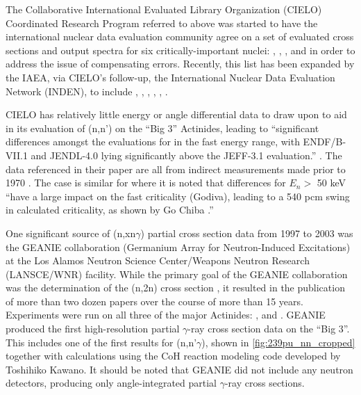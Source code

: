 \documentclass[letterpaper]{ar-1col}
\begin{document}
The Collaborative International Evaluated Library Organization (CIELO) Coordinated Research Program referred to above \cite{Cha18a} was started to have the international nuclear data evaluation community agree on a set of evaluated cross sections and output spectra for six critically-important nuclei: , , ,  and  in order to address the issue of compensating errors.
 Recently, this list has been expanded by the IAEA, via CIELO's follow-up, the International Nuclear Data Evaluation Network (INDEN), to include , , , , , .

CIELO has relatively little energy or angle differential data to draw upon to aid in its evaluation of (n,n') on the \enquote{Big 3} Actinides, leading to \enquote{significant differences amongst the evaluations for  in the fast energy range, with ENDF/B-VII.1 and JENDL-4.0 lying significantly above the JEFF-3.1 evaluation.} \cite{Cha14}.
 The  data referenced in their paper are all from indirect measurements made prior to 1970 \cite{Batchelor1969, Andreev1961}.
 The case is similar for  where it is noted that differences for $E_n >$ 50 keV \enquote{have a large impact on the fast criticality (Godiva), leading to a 540 pcm swing in calculated criticality, as shown by Go Chiba \cite{Chi12}.}

One significant source of (n,xn$\gamma$) partial cross section data from 1997 to 2003 was the GEANIE collaboration (Germanium Array for Neutron-Induced Excitations) at the Los Alamos Neutron Science Center/Weapons Neutron Research (LANSCE/WNR) facility.
While the primary goal of the GEANIE collaboration was the determination of the (n,2n) cross section \cite{Ber02}, it resulted in the publication of more than two dozen papers over the course of more than 15 years.
 Experiments were run on all three of the major Actinides:  \cite{You01},  \cite{Ber02} and  \cite{Fot04}.
 GEANIE produced the first high-resolution partial $\gamma$-ray cross section data on the \enquote{Big 3}.
This includes one of the first results for (n,n'$\gamma$), shown in \autoref{fig:239pu_nn_cropped}  together with calculations using the CoH reaction modeling code developed by Toshihiko Kawano. 
 It should be noted that GEANIE did not include any neutron detectors, producing only angle-integrated partial $\gamma$-ray cross sections.
\end{document}
